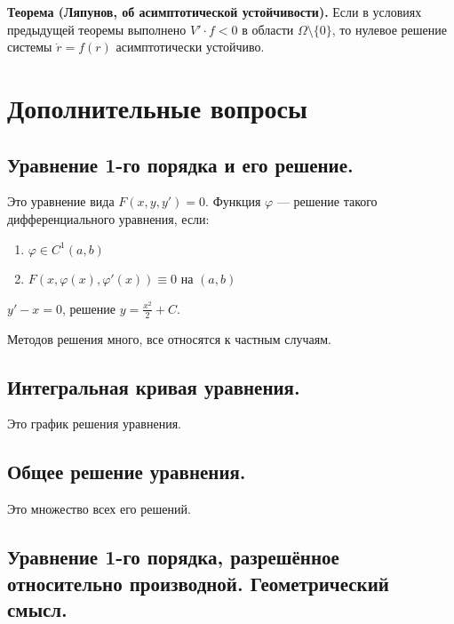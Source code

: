 \noindent \textbf{Теорема (Ляпунов, об асимптотической устойчивости).} Если в условиях предыдущей теоремы выполнено $V' \cdot f < 0$ в области $\Omega \setminus \{0\}$, то нулевое решение системы $\dot{r} = f(r)$ асимптотически устойчиво.


\section*{Дополнительные вопросы}

\subsection*{Уравнение 1-го порядка и его решение.}

Это уравнение вида \(F(x, y, y') = 0\).
Функция \(\varphi\) --- решение такого дифференциального уравнения, если:
\begin{enumerate}
    \item \(\varphi\in C^1(a, b)\)
    \item \(F(x, \varphi(x), \varphi'(x)) \equiv 0\) на \((a, b)\)
\end{enumerate}
\begin{example}
    \(y' - x = 0\), решение \(y = \frac{x^2}{2} + C\).
\end{example}

Методов решения много, все относятся к частным случаям.

\subsection*{Интегральная кривая уравнения.}

Это график решения уравнения.

\subsection*{Общее решение уравнения.}

Это множество всех его решений.

\subsection*{Уравнение 1-го порядка, разрешённое относительно производной. Геометрический смысл.}

